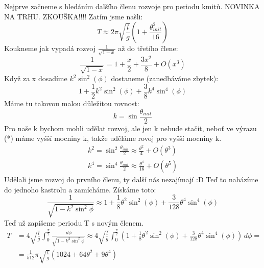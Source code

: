 \documentclass{article}
\begin{document}
Nejprve začneme s hledáním dalšího členu rozvoje pro periodu kmitů. NOVINKA NA TRHU. ZKOUŠKA!!!!
Zatím jsme našli:
\begin{equation*}
T \approx 2\pi \sqrt{\frac{l}{g}}\left(1+\frac{\theta_{init}^2}{16}\right)
\end{equation*}
Koukneme jak vypadá rozvoj $\frac{1}{\sqrt{1-x}}$ až do třetího člene:
\begin{equation*}
\frac{1}{\sqrt{1-x}} = 1+\frac{x}{2}+\frac{3 x^2}{8}+O\left(x^3\right)
\end{equation*}
Když za x dosadíme $k^2 \sin ^2(\phi )$ dostaneme (zanedbáváme zbytek):
\begin{equation}
1 + \frac{1}{2}k^2\sin^2(\phi)+\frac{3}{8}k^4\sin^4(\phi) \tag{*}
\end{equation}
Máme tu takovou malou důležitou rovnost:
\begin{equation*}
k = \sin\frac{\theta_{init}}{2}
\end{equation*}
Pro naše k bychom mohli udělat rozvoj, ale jen k nebude stačit, neboť ve výrazu (*) máme vyšší mocniny k, takže uděláme rovoj pro vyšší mocniny k.
\begin{align*}
k^2 = \sin^2\frac{\theta_{init}}{2} \approx \frac{\theta ^2}{4}+O\left(\theta ^3\right)\\
k^4 =  \sin^4\frac{\theta_{init}}{2} \approx \frac{\theta ^4}{16}+O\left(\theta ^5\right)
\end{align*}
Udělali jsme rozvoj do prvního členu, ty další nás nezajímají :D
Teď to naházíme do jednoho kastrolu a zamícháme. Získáme toto:
\begin{equation*}
\frac{1}{\sqrt{1-k^2\sin^2\phi}} \approx 1+\frac{1}{8} \theta ^2 \sin ^2(\phi )+\frac{3}{128} \theta ^4 \sin ^4(\phi )
\end{equation*}
Teď už zapíšeme periodu T s novým členem.
\begin{align*}
T &= 4\sqrt{\frac{l}{g}}\int_{0}^{\frac{\pi}{2}}\frac{\,d\phi}{\sqrt{1-k^2\sin^2\phi}}\approx 4\sqrt{\frac{l}{g}}\int_{0}^{\frac{\pi}{2}}\left(1+\frac{1}{8} \theta ^2 \sin ^2(\phi )+\frac{3}{128} \theta ^4 \sin ^4(\phi )\right)\,d\phi= \\
&= \frac{1}{512} \pi  \sqrt{\frac{l}{g}} \left(1024+64 \theta ^2+9 \theta ^4\right)
\end{align*}
\end{document}
